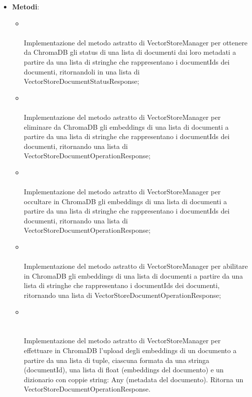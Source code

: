 \documentclass[10pt, a4paper]{article}
\begin{document}
\label{VectorStoreChromaDBManagerDettaglio}
\begin{itemize}
    \item \textbf{Metodi}:
    \begin{itemize}
        \item {}\\ \\
        Implementazione del metodo astratto di VectorStoreManager per ottenere da ChromaDB gli status di una lista di documenti dai loro metadati a partire da una lista di stringhe che rappresentano i documentIds dei documenti, ritornandoli in una lista di VectorStoreDocumentStatusResponse;
        \item {}\\ \\
        Implementazione del metodo astratto di VectorStoreManager per eliminare da ChromaDB gli embeddings di una lista di documenti a partire da una lista di stringhe che rappresentano i documentIds dei documenti, ritornando una lista di VectorStoreDocumentOperationResponse;
        \item {}\\ \\
        Implementazione del metodo astratto di VectorStoreManager per occultare in ChromaDB gli embeddings di una lista di documenti a partire da una lista di stringhe che rappresentano i documentIds dei documenti, ritornando una lista di VectorStoreDocumentOperationResponse;
        \item {}\\ \\
        Implementazione del metodo astratto di VectorStoreManager per abilitare in ChromaDB gli embeddings di una lista di documenti a partire da una lista di stringhe che rappresentano i documentIds dei documenti, ritornando una lista di VectorStoreDocumentOperationResponse;
        \item {}\\ \\ \\
        Implementazione del metodo astratto di VectorStoreManager per effettuare in ChromaDB l'upload degli embeddings di un documento a partire da una lista di tuple, ciascuna formata da una stringa (documentId), una lista di float (embeddings del documento) e un dizionario con coppie string: Any (metadata del documento). Ritorna un VectorStoreDocumentOperationResponse.
    \end{itemize}
\end{itemize}
\end{document}
